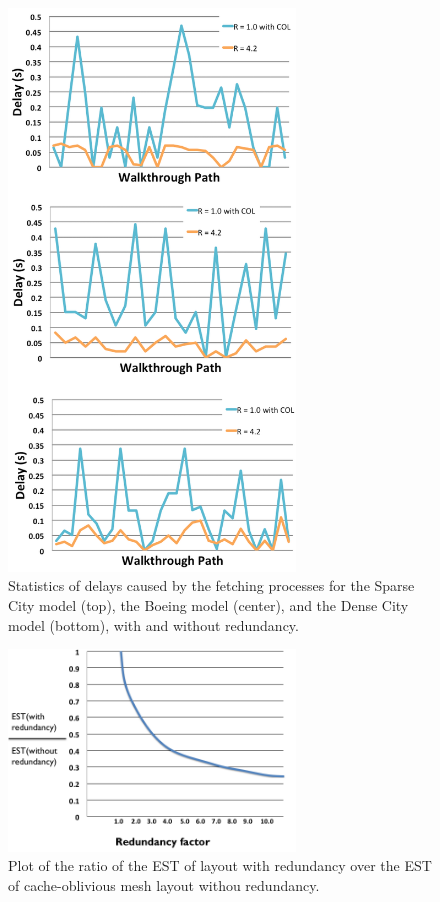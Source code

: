\documentclass[conference]{acmsiggraph}
\begin{document}
\begin{figure}[ht]
\centering
\includegraphics[width=3.0in]
{resultall.png}
  \caption{Statistics of delays caused by the fetching processes for the Sparse City model (top), the Boeing model (center), and
the Dense City model (bottom), with and without redundancy. }
  \label{fig:resultall}
\end{figure} 

\begin{figure}[ht]
\centering
\includegraphics[width=3.0in]{statistic.png}
  \caption{Plot of the ratio of the EST of layout with redundancy over the EST of cache-oblivious mesh layout withou redundancy. }
  \label{fig:statistic}
\end{figure} 
\end{document}
